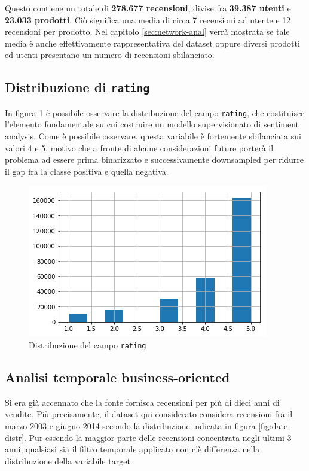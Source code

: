\documentclass[hidelinks, 12pt]{article}
\begin{document}
Questo contiene un totale di \textbf{278.677 recensioni}, divise fra \textbf{39.387 utenti} e \textbf{23.033 prodotti}. Ciò significa una media di circa 7 recensioni ad utente e 12 recensioni per prodotto. Nel capitolo \ref{sec:network-anal} verrà mostrata se tale media è anche effettivamente rappresentativa del dataset oppure diversi prodotti ed utenti presentano un numero di recensioni sbilanciato.



\subsection{Distribuzione di \texttt{rating}}
\label{sec:rating-distr}

In figura \ref{fig:rating-distr-orig} è possibile osservare la distribuzione del campo \texttt{rating}, che costituisce l'elemento fondamentale su cui costruire un modello supervisionato di sentiment analysis. Come è possibile osservare, questa variabile è fortemente sbilanciata sui valori 4 e 5, motivo che a fronte di alcune considerazioni future porterà il problema ad essere prima binarizzato e successivamente downsampled per ridurre il gap fra la classe positiva e quella negativa.

\begin{figure}[H]
	\centering
	\includegraphics[scale=0.7]{images/02_01_rating_distr.png}
	\caption[Distribuzione del campo \texttt{rating}]{Distribuzione del campo \texttt{rating}}
	\label{fig:rating-distr-orig}
\end{figure}



\subsection{Analisi temporale business-oriented}

Si era già accennato che la fonte fornisca recensioni per più di dieci anni di vendite. Più precisamente, il dataset qui considerato considera recensioni fra il marzo 2003 e giugno 2014 secondo la distribuzione indicata in figura \ref{fig:date-distr}. Pur essendo la maggior parte delle recensioni concentrata negli ultimi 3 anni, qualsiasi sia il filtro temporale applicato non c'è differenza nella distribuzione della variabile target.
\end{document}

